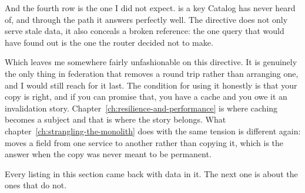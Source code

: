 And the fourth row is the one I did not expect.  is a key Catalog has
never heard of, and through the  path it answers perfectly
well. The directive does not only serve stale data, it also conceals a broken
reference: the one query that would have found out is the one the router
decided not to make.

%
Which leaves me somewhere fairly unfashionable on this directive. It is
genuinely the only thing in federation that removes a round trip rather than
arranging one, and I would still reach for it last. The condition for using it
honestly is that your copy is right, and if you can promise that, you have a
cache and you owe it an invalidation story.
Chapter~\ref{ch:resilience-and-performance} is where caching becomes a subject
and that is where the story belongs. What
chapter~\ref{ch:strangling-the-monolith} does with the same tension is
different again:  moves a field from one service to another
rather than copying it, which is the answer when the copy was never meant to be
permanent.

\medskip
Every listing in this section came back with data in it. The next one is about
the ones that do not.

%
